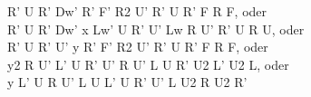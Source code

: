 R' U R' Dw' R' F' R2 U' R' U R' F R F, oder\\
R' U R' Dw' x Lw' U R' U' Lw R U' R' U R U, oder\\
R' U R' U' y R' F' R2 U' R' U R' F R F, oder\\
y2 R U' L' U R' U' R U' L U R' U2 L' U2 L, oder\\
y L' U R U' L U L' U R' U' L U2 R U2 R'\\

